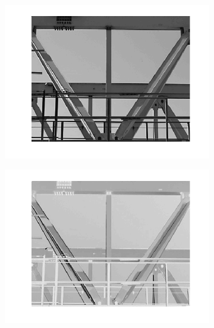 \documentclass{article}
\begin{document}
\begin{figure}[ht]
    \centering
    \begin{subfigure}[c]{0.32\linewidth}
    	\centering
    	\includegraphics[width=\linewidth]{images/1/1-2-gantrycrane_c1.png}
    \end{subfigure}
    \hfill
    \begin{subfigure}[c]{0.32\linewidth}
    	\centering
    	\includegraphics[width=\linewidth]{images/1/1-2-gantrycrane_c2.png}
    \end{subfigure}
    \hfill
    \begin{subfigure}[c]{0.32\linewidth}
    	\centering

\end{subfigure}
\end{figure}
\end{document}
